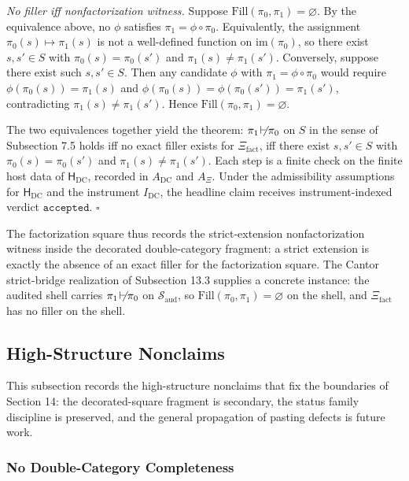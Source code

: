 \documentclass[11pt]{article}
\providecommand{\factor}{\mathrel{\!\vdash\!}}
\theoremstyle{definition}
\begin{document}
\emph{No filler iff nonfactorization witness.} Suppose \(\mathrm{Fill}(\pi_{0},\pi_{1})=\varnothing\). By the equivalence above, no \(\phi\) satisfies \(\pi_{1}=\phi\circ\pi_{0}\). Equivalently, the assignment \(\pi_{0}(s)\mapsto\pi_{1}(s)\) is not a well-defined function on \(\mathrm{im}(\pi_{0})\), so there exist \(s,s'\in S\) with \(\pi_{0}(s)=\pi_{0}(s')\) and \(\pi_{1}(s)\neq\pi_{1}(s')\). Conversely, suppose there exist such \(s,s'\in S\). Then any candidate \(\phi\) with \(\pi_{1}=\phi\circ\pi_{0}\) would require \(\phi(\pi_{0}(s))=\pi_{1}(s)\) and \(\phi(\pi_{0}(s))=\phi(\pi_{0}(s'))=\pi_{1}(s')\), contradicting \(\pi_{1}(s)\neq\pi_{1}(s')\). Hence \(\mathrm{Fill}(\pi_{0},\pi_{1})=\varnothing\).

The two equivalences together yield the theorem: \(\pi_{1}\not\factor\pi_{0}\) on \(S\) in the sense of Subsection 7.5 holds iff no exact filler exists for \(\Xi_{\mathrm{fact}}\), iff there exist \(s,s'\in S\) with \(\pi_{0}(s)=\pi_{0}(s')\) and \(\pi_{1}(s)\neq\pi_{1}(s')\). Each step is a finite check on the finite host data of \(\mathsf H_{\mathrm{DC}}\), recorded in \(A_{\mathrm{DC}}\) and \(A_{\Xi}\). Under the admissibility assumptions for \(\mathsf H_{\mathrm{DC}}\) and the instrument \(I_{\mathrm{DC}}\), the headline claim receives instrument-indexed verdict \(\texttt{accepted}\). \(\square\)

The factorization square thus records the strict-extension nonfactorization witness inside the decorated double-category fragment: a strict extension is exactly the absence of an exact filler for the factorization square. The Cantor strict-bridge realization of Subsection 13.3 supplies a concrete instance: the audited shell carries \(\pi_{1}\not\factor\pi_{0}\) on \(\mathcal S_{\mathrm{aud}}\), so \(\mathrm{Fill}(\pi_{0},\pi_{1})=\varnothing\) on the shell, and \(\Xi_{\mathrm{fact}}\) has no filler on the shell.

\subsection{High-Structure Nonclaims}

This subsection records the high-structure nonclaims that fix the boundaries of Section 14: the decorated-square fragment is secondary, the status family discipline is preserved, and the general propagation of pasting defects is future work.

\subsubsection{No Double-Category Completeness}
\end{document}
